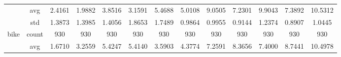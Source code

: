 \begin{table}[htbp]
{\begin{tabular}{rcccccccccccc}
			                                   & avg                                    & 2.4161                                                                             & \cellcolor[rgb]{ .776,  .937,  .808}\textcolor[rgb]{ 0,  .38,  0}{1.9882} & 3.8516                                                                    & 3.1591                                                                    & 5.4688                                        & 5.0108                                      & 9.0505                                         & 7.2301                                         & 9.9043                                         & 7.3892                                         & 10.5312                                        \\
			                                   & std                                    & 1.3873                                                                             & 1.3985                                                                    & 1.4056                                                                    & 1.8653                                                                    & 1.7489                                        & 0.9864                                      & 0.9955                                         & 0.9144                                         & 1.2374                                         & 0.8907                                         & 1.0445                                         \\
			bike                               & count                                  & 930                                                                                & 930                                                                       & 930                                                                       & 930                                                                       & 930                                           & 930                                         & 930                                            & 930                                            & 930                                            & 930                                            & 930                                            \\
			                                   & avg                                    & \cellcolor[rgb]{ .776,  .937,  .808}\textcolor[rgb]{ 0,  .38,  0}{1.6710}          & 3.2559                                                                    & 5.4247                                                                    & 5.4140                                                                    & 3.5903                                        & 4.3774                                      & 7.2591                                         & 8.3656                                         & 7.4000                                         & 8.7441                                         & 10.4978                                        \\

\end{tabular}}
\end{table}
